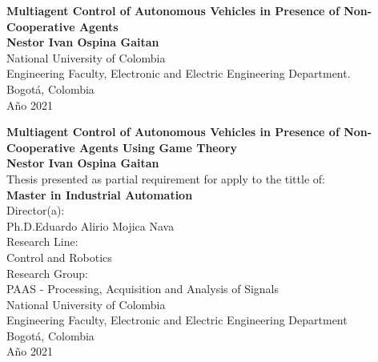 
\begin{center}
\begin{figure}
\centering%
%
\end{figure}
\thispagestyle{empty} \vspace*{2.0cm} \textbf{\huge
Multiagent Control of Autonomous Vehicles in Presence of Non-Cooperative Agents}\\[5.0cm]
\Large\textbf{Nestor Ivan Ospina Gaitan}\\[5.0cm]
\small National University of Colombia\\
Engineering Faculty, Electronic and Electric Engineering Department.\\
Bogotá, Colombia\\
A\~{n}o 2021\\
\end{center}


\newpage
\begin{center}
\thispagestyle{empty} \vspace*{0cm} \textbf{\huge
Multiagent Control of Autonomous Vehicles in Presence of Non-Cooperative Agents Using
Game Theory}\\[3.0cm]
\Large\textbf{Nestor Ivan Ospina Gaitan}\\[2.0cm]
\small Thesis presented as partial requirement for apply to the tittle of:\\
\textbf{Master in Industrial Automation}\\[2cm]
Director(a):\\
Ph.D.Eduardo Alirio Mojica Nava\\[2.0cm]
Research Line:\\
Control and Robotics\\
Research Group:\\
PAAS - Processing, Acquisition and Analysis of Signals\\[2cm]
National University of Colombia\\
Engineering Faculty, Electronic and Electric Engineering Department\\
Bogotá, Colombia\\
A\~{n}o 2021\\
\end{center}


